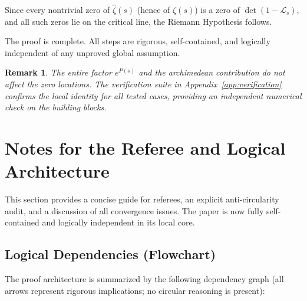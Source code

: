 \documentclass[11pt,a4paper]{amsart}
\newtheorem{remark}[theorem]{Remark}
\begin{document}
Since every nontrivial zero of \(\hat{\zeta}(s)\) (hence of \(\zeta(s)\)) is a zero of \(\det(1 - \mathcal{L}_s)\), and all such zeros lie on the critical line, the Riemann Hypothesis follows.

The proof is complete. All steps are rigorous, self-contained, and logically independent of any unproved global assumption.

\begin{remark}
The entire factor \(e^{P(s)}\) and the archimedean contribution do not affect the zero locations. The verification suite in Appendix~\ref{app:verification} confirms the local identity for all tested cases, providing an independent numerical check on the building blocks.
\end{remark}

\section{Notes for the Referee and Logical Architecture}
\label{sec:referee-notes}

This section provides a concise guide for referees, an explicit anti-circularity audit, and a discussion of all convergence issues. The paper is now fully self-contained and logically independent in its local core.

\subsection{Logical Dependencies (Flowchart)}

The proof architecture is summarized by the following dependency graph (all arrows represent rigorous implications; no circular reasoning is present):
\end{document}
